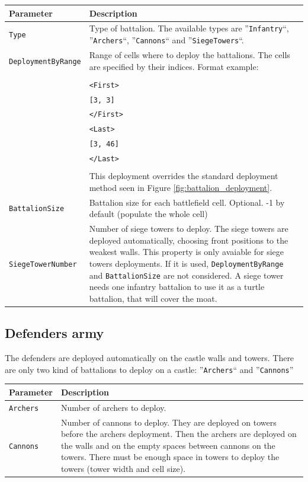 \documentclass[tog]{acmsiggraph}
\begin{document}
\begin{tabularx}{0.48\textwidth}{ |l|X| }
\hline 
\textbf{Parameter} & \textbf{Description} \\[0.15cm]
 \hline
 \texttt{Type} & Type of battalion. The available types are ''\texttt{Infantry}``, ''\texttt{Archers}``, ''\texttt{Cannons}`` and ''\texttt{SiegeTowers}``. \\
 \hline
 \texttt{DeploymentByRange} & Range of cells where to deploy the battalions. The cells are specified by their indices. Format example: \\
 & \\
 & \quad\texttt{<First>} \\
 & \quad\quad\texttt{[3, 3]} \\
 & \quad\texttt{</First>} \\
 & \quad\texttt{<Last>} \\
 & \quad\quad\texttt{[3, 46]} \\
 & \quad\texttt{</Last>} \\
 & \\
 & This deployment overrides the standard deployment method seen in Figure \ref{fig:battalion_deployment}.\\
 \hline
 \texttt{BattalionSize} & Battalion size for each battlefield cell. Optional. -1 by default (populate the whole cell) \\
 \hline
 \texttt{SiegeTowerNumber} & Number of siege towers to deploy. The siege towers are deployed automatically, choosing front positions to the weakest walls. This property is only avaiable for siege towers deployments. If it is used, \texttt{DeploymentByRange} and \texttt{BattalionSize} are not considered. A siege tower needs one infantry battalion to use it as a turtle battalion, that will cover the moat. \\
 \hline
\end{tabularx} 



\subsection{Defenders army}
\label{sec:battledefenders}

The defenders are deployed automatically on the castle walls and towers. 
There are only two kind of battalions to deploy on a castle: ''\texttt{Archers}`` and ''\texttt{Cannons}''

\begin{tabularx}{0.48\textwidth}{ |l|X| }
\hline 
\textbf{Parameter} & \textbf{Description} \\[0.15cm]
 \hline
 \texttt{Archers} & Number of archers to deploy. \\
 \hline
 \texttt{Cannons} & Number of cannons to deploy. They are deployed on towers before the archers deployment. Then the archers are deployed on the walls and on the empty spaces between cannons on the towers. There must be enough space in towers to deploy the towers (tower width and cell size). \\
 \hline
\end{tabularx} 
 
\end{document}
